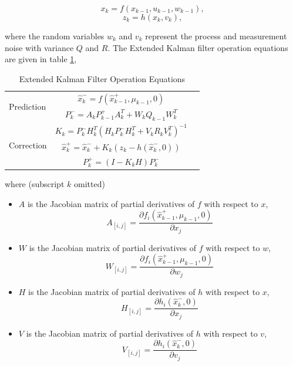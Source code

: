 \begin{equation}
x_k=f(x_{k-1}, u_{k-1}, w_{k-1}),
\end{equation}
\begin{equation}
z_k=h(x_k, v_k),
\end{equation}

\noindent where the random variables $w_k$ and $v_k$ represent the
process and measurement noise with variance $Q$ and $R$. The Extended
Kalman filter operation equations are given in table \ref{tab:EKF},

\begin{table}[H]
\caption{Extended Kalman Filter Operation Equations}
\label{tab:EKF}
\centering
\begin{tabular}{|l|c r|}
\hline
\multirow{2}{*}{Prediction} 
& $\hat{x}^-_k=f(\hat{x}^+_{k-1},\mu_{k-1},0)$ & \stepcounter{equation}\thetag{\theequation}\\
& $P^-_k = A_kP^+_{k-1}A_k^T+W_kQ_{k-1}W_k^T$ & \stepcounter{equation}\thetag{\theequation}\\
\hline
\multirow{3}{*}{Correction}
& $K_k=P^-_kH_k^T(H_kP^-_kH_k^T+V_kR_kV_k^T)^{-1}$  & \stepcounter{equation}\thetag{\theequation}\\
& $\hat{x}^+_k = \hat{x}^-_k+K_k(z_k-h(\hat{x}^-_k,0))$ & \stepcounter{equation}\thetag{\theequation}\\
& $P^+_k = (I-K_kH)P^-_k$ & \stepcounter{equation}\thetag{\theequation}\\
\hline
\end{tabular}
\end{table}
\FloatBarrier

\noindent where (subscript $k$ omitted)
\begin{itemize}
  \item $A$ is the Jacobian matrix of partial derivatives of $f$ with
  respect to $x$, $$A_{[i,j]}= \frac{\partial f_i(\hat{x}_{k-1}^+,
    \mu_{k-1}, 0)}{\partial x_j}$$
  \item $W$ is the Jacobian matrix of partial derivatives of $f$ with
  respect to $w$, $$W_{[i,j]}= \frac{\partial f_i(\hat{x}_{k-1}^+,
    \mu_{k-1}, 0)}{\partial w_j}$$
  \item $H$ is the Jacobian matrix of partial derivatives of $h$ with
  respect to $x$, $$H_{[i,j]}= \frac{\partial h_i(\hat{x}_k^-,
    0)}{\partial x_j}$$
  \item $V$ is the Jacobian matrix of partial derivatives of $h$ with
  respect to $v$, $$V_{[i,j]}= \frac{\partial
    h_i(\hat{x}_k^-,0)}{\partial v_j}$$
\end{itemize}

